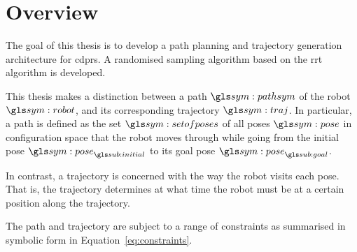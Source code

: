 \chapter{Overview}%
\label{chap:overview}

	The goal of this thesis is to develop a path planning and trajectory
	generation architecture for \glspl{cdpr}. A randomised sampling algorithm
	based on the \gls{rrt} algorithm is developed.

	This thesis makes a distinction between a path $\pathsym$ of the robot
	$\robot$, and its corresponding trajectory $\traj$. In particular, a path is
	defined as the set $\setofposes$ of all poses $\pose$ in configuration space
	that the robot moves through while going from the initial pose
	$\pose_{\initial}$ to its goal pose $\pose_{\goal}$.

	In contrast, a trajectory is concerned with the way the robot visits each
	pose. That is, the trajectory determines at what time the robot must be at a
	certain position along the trajectory.

	The path and trajectory are subject to a range of constraints as summarised
	in symbolic form in Equation~\ref{eq:constraints}.

